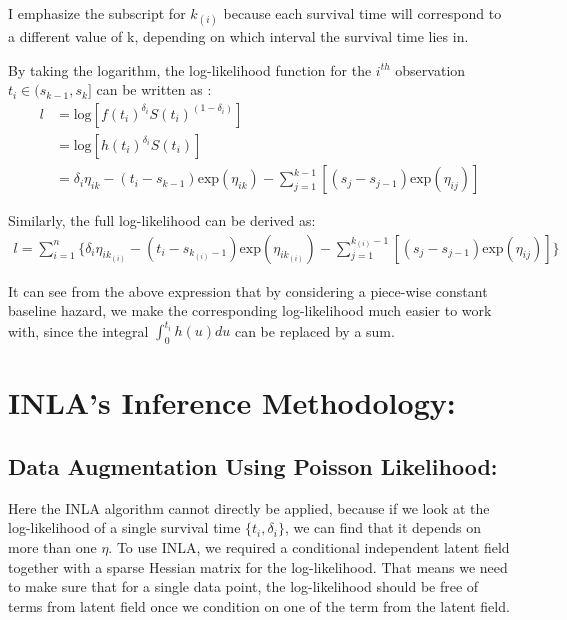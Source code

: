 \documentclass[]{article}
\begin{document}
I emphasize the subscript for \(k_{(i)}\) because each survival time
will correspond to a different value of k, depending on which interval
the survival time lies in.

By taking the logarithm, the log-likelihood function for the \(i^{th}\)
observation \(t_i \in (s_{k-1},s_k]\) can be written as :
\begin{equation}\begin{aligned}\label{eqn:loglike}
l &= \text{log}[f(t_i)^{\delta_i}S(t_i)^{(1-\delta_i)}] \\
  &= \text{log}[h(t_i)^{\delta_i}S(t_i)]\\
  &= \delta_i \eta_{ik} - (t_i-s_{k-1})\text{exp}(\eta_{ik})-\sum_{j=1}^{k-1} [(s_{j}-s_{j-1})\text{exp}(\eta_{ij})]
\end{aligned}\end{equation}

Similarly, the full log-likelihood can be derived as:
\begin{equation}\begin{aligned}\label{eqn:fullloglike1}
l = \sum_{i=1}^{n} \bigg \{ \delta_i \eta_{ik_{(i)}} - (t_i-s_{k_{(i)}-1})\text{exp}(\eta_{ik_{(i)}})-\sum_{j=1}^{{k_{(i)}}-1} [(s_{j}-s_{j-1})\text{exp}(\eta_{ij})]\bigg \}
\end{aligned}\end{equation}

It can see from the above expression that by considering a piece-wise
constant baseline hazard, we make the corresponding log-likelihood much
easier to work with, since the integral \(\int_{0}^{t_i} h(u)du\) can be
replaced by a sum.

\newpage

\hypertarget{inlas-inference-methodology}{%
\section{INLA's Inference
Methodology:}\label{inlas-inference-methodology}}

\hypertarget{data-augmentation-using-poisson-likelihood}{%
\subsection{Data Augmentation Using Poisson
Likelihood:}\label{data-augmentation-using-poisson-likelihood}}

Here the INLA algorithm cannot directly be applied, because if we look
at the log-likelihood of a single survival time \(\{t_i,\delta_i\}\), we
can find that it depends on more than one \(\eta\). To use INLA, we
required a conditional independent latent field together with a sparse
Hessian matrix for the log-likelihood. That means we need to make sure
that for a single data point, the log-likelihood should be free of terms
from latent field once we condition on one of the term from the latent
field.
\end{document}
